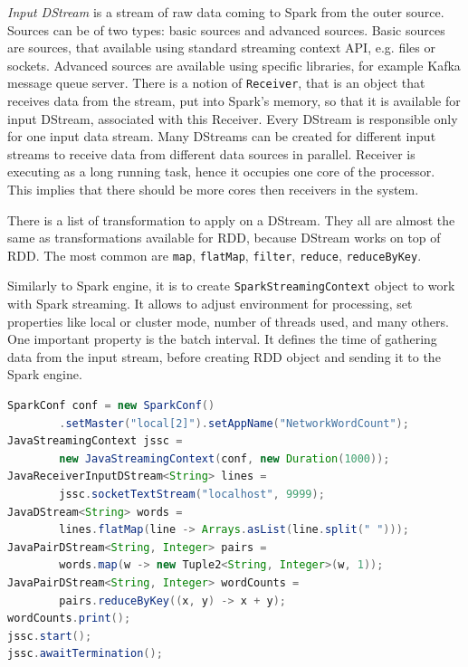 \textit{Input DStream} is a stream of raw data coming to Spark from the outer source.
Sources can be of two types: basic sources and advanced sources.
Basic sources are sources, that available using standard streaming context API, e.g. files or sockets.
Advanced sources are available using specific libraries, for example Kafka message queue server.
There is a notion of \lstinline{Receiver}, that is an object that receives data from the stream, put into Spark's memory, so that it is available for input DStream, associated with this Receiver.
Every DStream is responsible only for one input data stream.
Many DStreams can be created for different input streams to receive data from different data sources in parallel.
Receiver is executing as a long running task, hence it occupies one core of the processor.
This implies that there should be more cores then receivers in the system.

There is a list of transformation to apply on a DStream.
They all are almost the same as transformations available for RDD, because DStream works on top of RDD.
The most common are \lstinline{map}, \lstinline{flatMap}, \lstinline{filter}, \lstinline{reduce}, \lstinline{reduceByKey}.

Similarly to Spark engine, it is to create \lstinline{SparkStreamingContext} object to work with Spark streaming.
It allows to adjust environment for processing, set properties like local or cluster mode, number of threads used, and many others.
One important property is the batch interval.
It defines the time of gathering data from the input stream, before creating RDD object and sending it to the Spark engine.

\begin{lstlisting}[float=h, caption={Counting the frequencies of words in the text lines, coming from the TCP socket.}, label=listing:DStreamExampleCode, language=Java]
SparkConf conf = new SparkConf()
		.setMaster("local[2]").setAppName("NetworkWordCount");
JavaStreamingContext jssc =
		new JavaStreamingContext(conf, new Duration(1000));
JavaReceiverInputDStream<String> lines =
		jssc.socketTextStream("localhost", 9999);
JavaDStream<String> words =
		lines.flatMap(line -> Arrays.asList(line.split(" ")));
JavaPairDStream<String, Integer> pairs =
		words.map(w -> new Tuple2<String, Integer>(w, 1));
JavaPairDStream<String, Integer> wordCounts =
		pairs.reduceByKey((x, y) -> x + y);
wordCounts.print();
jssc.start();
jssc.awaitTermination();
\end{lstlisting}

